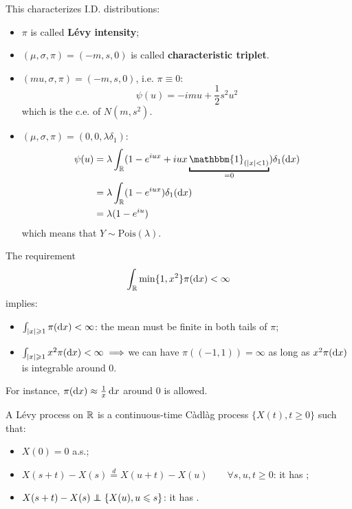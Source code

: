 \documentclass[class=article,crop=false]{standalone}
\begin{document}
This characterizes I.D. distributions:
\begin{itemize}
	\item $\pi$ is called \textbf{L\'evy intensity};
	\item $(\mu,\sigma,\pi)=(-m,s,0)$ is called \textbf{characteristic triplet}.
\end{itemize}
\begin{example}
	\begin{itemize}
		\item $(mu,\sigma,\pi)=(-m,s,0)$, i.e. $\pi\equiv0$:
		\[
		\psi(u)=-imu+\frac{1}{2}s^2u^2
		\]which is the c.e. of $N(m,s^2)$.
		\item $(\mu,\sigma,\pi)=(0,0,\lambda\delta_1)$:
		\begin{align*}
			\psi(u)&=\lambda\int_\R(1-e^{iux}+iux\underbracket{\mathbbm{1}_{(|x|<1)}}_{\mathclap{=0}})\delta_1(\dif x)\\
			&=\lambda\int_\R(1-e^{iux})\delta_1(\dif x)\\
			&=\lambda(1-e^{iu})
		\end{align*}which means that $Y\sim\text{Pois}(\lambda)$.
	\end{itemize}
\end{example}
The requirement \[\int_{\mathbb{R}}\min\{1,x^2\}\pi(\mathop{}\!\mathrm{d} x)<\infty
\]
implies:
\begin{itemize}
	\item $\int_{|x|\geqslant1}\pi(\mathop{}\!\mathrm{d} x)<\infty$: the mean must be finite in both tails of $\pi$;
	\item $\int_{|x|\geqslant1}x^2\pi(\mathop{}\!\mathrm{d} x)<\infty\implies$we can have $\pi\left((-1,1)\right)=\infty$ as long as $x^2\pi(\mathop{}\!\mathrm{d} x)$ is integrable around 0.
\end{itemize}
For instance, $\pi(\mathop{}\!\mathrm{d} x)\approx\frac{1}{x}\mathop{}\!\mathrm{d} x$ around 0 is allowed.
\begin{figure}[H]
	\centering
	
\end{figure}
\begin{definition}
		A L\'evy process on $\mathbb{R}$ is a continuous-time Càdlàg process $\{X(t),t\geqslant0\}$ such that:
	\begin{itemize}
		\item $X(0)=0$ a.s.;
		\item $X(s+t)-X(s)\stackrel{d}{=}X(u+t)-X(u)\qquad\forall s, u,t\geqslant0$: it has ;
		\item $X(s+t)-X(s)\independent\{X(u),u\leqslant s\}$: it has .
	\end{itemize}
\end{definition}
\end{document}
